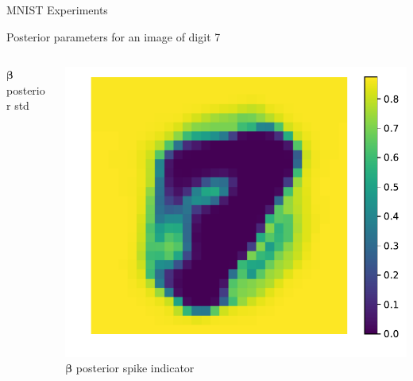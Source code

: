 \documentclass[9pt]{beamer}
\begin{document}
\begin{frame}{MNIST Experiments}
\begin{block}{Posterior parameters for an image of digit 7}
\begin{columns}
\begin{column}{0.33\textwidth}
        \(\boldsymbol\beta \) posterior std
      \end{column}
      \begin{column}{0.33\textwidth}
        \centering
        \includegraphics[width=0.75\columnwidth]{graphics/posterior_spike_indicator}\\
        \(\boldsymbol\beta \) posterior spike indicator
      \end{column}
    \end{columns}
  \end{block}


\end{frame}
\end{document}
